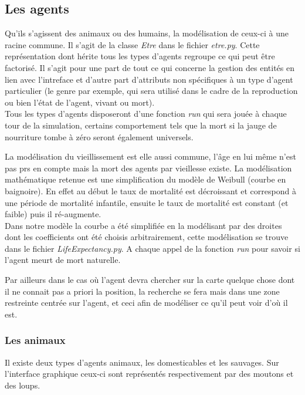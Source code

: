 \documentclass[12pt]{article}
\begin{document}
	\subsection{Les agents}

Qu'ils s'agissent des animaux ou des humains, la modélisation de ceux-ci à 
une racine commune. Il s'agit de la classe \textit{Etre} dans le fichier 
\textit{etre.py}. Cette représentation dont hérite tous les types d'agents 
regroupe ce qui peut être factorisé. Il s'agit pour une part de tout ce qui 
concerne la gestion des entités en lien avec l'intreface et d'autre part 
d'attributs non spécifiques à un type d'agent particulier (le genre par 
exemple, qui sera utilisé dans le cadre de la reproduction ou bien l'état de 
l'agent, vivant ou mort).\\

Tous les types d'agents disposeront d'une fonction \textit{run} qui sera jouée 
à chaque tour de la simulation, certains comportement tels que la mort si la 
jauge de nourriture tombe à zéro seront également universels.

La modélisation du vieillissement est elle aussi commune, l'âge en lui même 
n'est pas prs en compte mais la mort des agents par vieillesse existe. La 
modélisation mathématique retenue est une simplification du modèle de Weibull 
(courbe en baignoire). En effet au début le taux de mortalité est décroissant 
et correspond à une période de mortalité infantile, ensuite le taux de 
mortalité est constant (et faible) puis il ré-augmente.\\


Dans notre modèle la courbe a été simplifiée en la modélisant par des droites 
dont les coefficients ont été choisis arbitrairement, cette modélisation se 
trouve dans le fichier \textit{LifeExpectancy.py}. A chaque appel de la 
fonction \textit{run} pour savoir si l'agent meurt de mort naturelle.

Par ailleurs dans le cas où l'agent devra chercher sur la carte quelque chose 
dont il ne connait pas a priori la position, la recherche se fera mais dans 
une zone restreinte centrée sur l'agent, et ceci afin de modéliser ce qu'il 
peut voir d'où il est.

		\subsubsection{Les animaux}

Il existe deux types d'agents animaux, les domesticables et les sauvages. Sur 
l'interface graphique ceux-ci sont représentés respectivement par des moutons 
et des loups.\\
\end{document}
